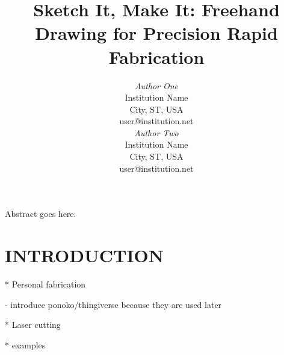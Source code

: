 \documentclass{article}
\begin{document}

\toappear{}



\title{Sketch It, Make It: Freehand Drawing for Precision Rapid Fabrication}

\author{
\parbox[t]{9cm}{\centering
	     {\em Author One}\\
	     Institution Name\\
             City, ST, USA\\
	     user@institution.net}
\parbox[t]{9cm}{\centering
	     {\em Author Two}\\
	     Institution Name\\
             City, ST, USA\\
	     user@institution.net}
}

\maketitle

\abstract Abstract goes here. 






\section{INTRODUCTION}
* Personal fabrication

  - introduce ponoko/thingiverse because they are used later

* Laser cutting

* examples
\end{document}
